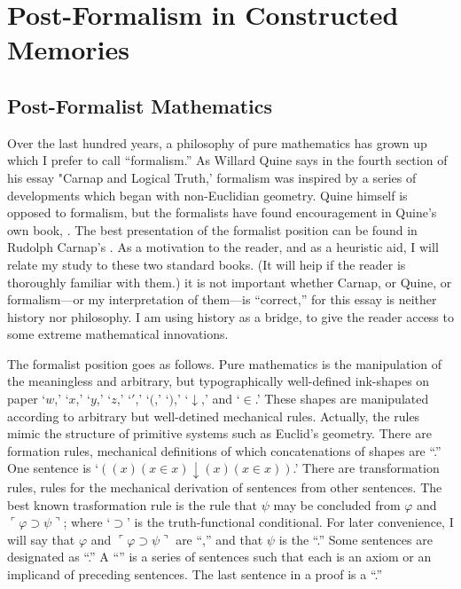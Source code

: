\newcommand{\midheading}[1]{
	{ \vskip 1em \centering \large \textsc{#1} \par \vskip 1em }}

\newcommand{\sysname}[1]{\enquote{\textsc{#1}}}

\chapter{Post-Formalism in Constructed Memories}
\section{Post-Formalist Mathematics}

Over the last hundred years, a philosophy of pure mathematics has 
grown up which I prefer to call \enquote{formalism.} As Willard Quine says in the 
fourth section of his essay "Carnap and Logical Truth,' formalism was 
inspired by a series of developments which began with non-Euclidian 
geometry. Quine himself is opposed to formalism, but the formalists have 
found encouragement in Quine's own book, . The best 
presentation of the formalist position can be found in Rudolph Carnap's 
. As a motivation to the reader, and 
as a heuristic aid, I will relate my study to these two standard books. (It will 
heip if the reader is thoroughly familiar with them.) it is not important 
whether Carnap, or Quine, or formalism---or my interpretation of them---is 
\enquote{correct,} for this essay is neither history nor philosophy. I am using history 
as a bridge, to give the reader access to some extreme mathematical 
innovations. 

The formalist position goes as follows. Pure mathematics is the 
manipulation of the meaningless and arbitrary, but typographically 
well-defined ink-shapes on paper `$w$,' `$x$,' `$y$,' `$z$,' `${}'$,' `$($,' `$)$,' `$\downarrow$,' and `$\in$.' 
These shapes are manipulated according to arbitrary but well-detined 
mechanical rules. Actually, the rules mimic the structure of primitive 
systems such as Euclid's geometry. There are formation rules, mechanical 
definitions of which concatenations of shapes are \enquote{.} One sentence 
is `$((x) (x\in x) \downarrow (x) (x\in x))$.' There are transformation rules, rules for the 
mechanical derivation of sentences from other sentences. The best known 
trasformation rule is the rule that $\psi$ may be concluded from $\varphi$ and 
$\ulcorner \varphi \supset \psi \urcorner$; 
where `$\supset$' is the truth-functional conditional. For later convenience, I will 
say that $\varphi$ and $\ulcorner \varphi \supset \psi \urcorner$ are \enquote{,} 
and that $\psi$ is the \enquote{.} 
Some sentences are designated as \enquote{.} A \enquote{} is a series of 
sentences such that each is an axiom or an implicand of preceding sentences. 
The last sentence in a proof is a \enquote{.} 

